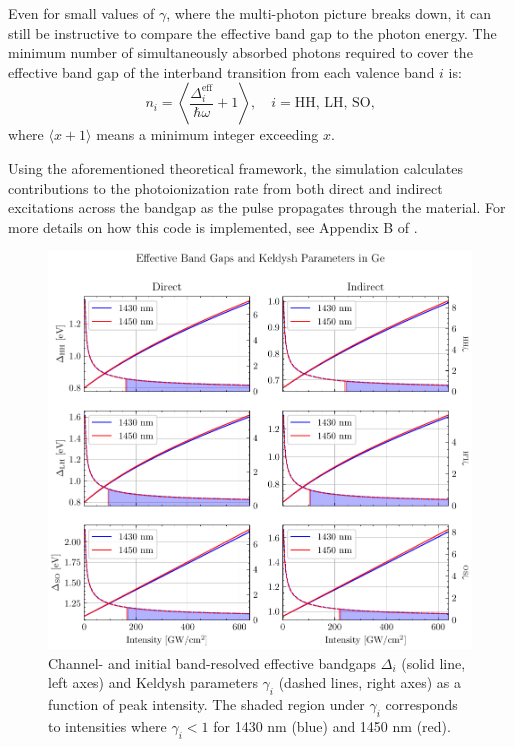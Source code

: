 Even for small values of $\gamma$, where the multi-photon picture breaks down, it can still be instructive to compare the effective band gap to the photon energy. The minimum number of simultaneously absorbed photons required to cover the effective band gap of the interband transition from each valence band $i$ is:
\begin{equation}
n_i = \left\langle  \frac{\Delta_i^{\textrm{eff}}}{\hbar \omega} + 1 \right\rangle, \quad i = \textrm{HH, LH, SO,}
\label{eqn:min_number_photons}
\end{equation}
where $\langle x+1 \rangle$ means a minimum integer exceeding $x$.

Using the aforementioned theoretical framework, the simulation calculates contributions to the photoionization rate from both direct and indirect excitations across the bandgap as the pulse propagates through the material. For more details on how this code is implemented, see Appendix B of \cite{austinSemiconductorSurfaceModification2017}.

\begin{figure}
	\centering
	\includegraphics[width=1.0\textwidth]{figures/chap4/Gamma_Gap_Channel_VB_resolved.pdf}
	\caption{Channel- and initial band-resolved effective bandgaps $\Delta_i$ (solid line, left axes) and Keldysh parameters $\gamma_i$ (dashed lines, right axes) as a function of peak intensity. The shaded region under $\gamma_i$ corresponds to intensities where $\gamma_i < 1$ for 1430 nm (blue) and 1450 nm (red).}
	\label{fig:Gamma_Gap_Channel_VB_resolved}
\end{figure}

